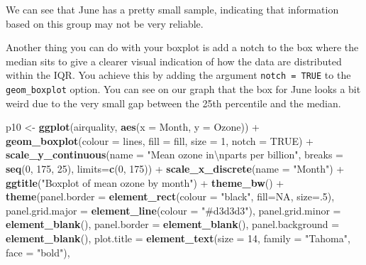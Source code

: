 \documentclass[]{article}
\newenvironment{Shaded}{\begin{snugshade}}{\end{snugshade}}
\newcommand{\KeywordTok}[1]{\textcolor[rgb]{0.13,0.29,0.53}{\textbf{{#1}}}}
\newcommand{\DataTypeTok}[1]{\textcolor[rgb]{0.13,0.29,0.53}{{#1}}}
\newcommand{\DecValTok}[1]{\textcolor[rgb]{0.00,0.00,0.81}{{#1}}}
\newcommand{\CharTok}[1]{\textcolor[rgb]{0.31,0.60,0.02}{{#1}}}
\newcommand{\StringTok}[1]{\textcolor[rgb]{0.31,0.60,0.02}{{#1}}}
\newcommand{\OtherTok}[1]{\textcolor[rgb]{0.56,0.35,0.01}{{#1}}}
\newcommand{\NormalTok}[1]{{#1}}
\begin{document}
We can see that June has a pretty small sample, indicating that
information based on this group may not be very reliable.

Another thing you can do with your boxplot is add a notch to the box
where the median sits to give a clearer visual indication of how the
data are distributed within the IQR. You achieve this by adding the
argument \texttt{notch\ =\ TRUE} to the \texttt{geom\_boxplot} option.
You can see on our graph that the box for June looks a bit weird due to
the very small gap between the 25th percentile and the median.

\begin{Shaded}
\begin{Highlighting}[]
\NormalTok{p10 <-}\StringTok{ }\KeywordTok{ggplot}\NormalTok{(airquality, }\KeywordTok{aes}\NormalTok{(}\DataTypeTok{x =} \NormalTok{Month, }\DataTypeTok{y =} \NormalTok{Ozone)) +}\StringTok{ }
\StringTok{  }\KeywordTok{geom_boxplot}\NormalTok{(}\DataTypeTok{colour =} \NormalTok{lines, }\DataTypeTok{fill =} \NormalTok{fill,}
    \DataTypeTok{size =} \DecValTok{1}\NormalTok{, }\DataTypeTok{notch =} \OtherTok{TRUE}\NormalTok{) +}
\StringTok{  }\KeywordTok{scale_y_continuous}\NormalTok{(}\DataTypeTok{name =} \StringTok{"Mean ozone in}\CharTok{\textbackslash{}n}\StringTok{parts per billion"}\NormalTok{,}
    \DataTypeTok{breaks =} \KeywordTok{seq}\NormalTok{(}\DecValTok{0}\NormalTok{, }\DecValTok{175}\NormalTok{, }\DecValTok{25}\NormalTok{), }\DataTypeTok{limits=}\KeywordTok{c}\NormalTok{(}\DecValTok{0}\NormalTok{, }\DecValTok{175}\NormalTok{)) +}
\StringTok{  }\KeywordTok{scale_x_discrete}\NormalTok{(}\DataTypeTok{name =} \StringTok{"Month"}\NormalTok{) +}
\StringTok{  }\KeywordTok{ggtitle}\NormalTok{(}\StringTok{"Boxplot of mean ozone by month"}\NormalTok{) +}
\StringTok{  }\KeywordTok{theme_bw}\NormalTok{() +}
\StringTok{  }\KeywordTok{theme}\NormalTok{(}\DataTypeTok{panel.border =} \KeywordTok{element_rect}\NormalTok{(}\DataTypeTok{colour =} \StringTok{"black"}\NormalTok{, }\DataTypeTok{fill=}\OtherTok{NA}\NormalTok{, }\DataTypeTok{size=}\NormalTok{.}\DecValTok{5}\NormalTok{),}
    \DataTypeTok{panel.grid.major =} \KeywordTok{element_line}\NormalTok{(}\DataTypeTok{colour =} \StringTok{"#d3d3d3"}\NormalTok{), }
    \DataTypeTok{panel.grid.minor =} \KeywordTok{element_blank}\NormalTok{(), }
    \DataTypeTok{panel.border =} \KeywordTok{element_blank}\NormalTok{(), }\DataTypeTok{panel.background =} \KeywordTok{element_blank}\NormalTok{(),}
    \DataTypeTok{plot.title =} \KeywordTok{element_text}\NormalTok{(}\DataTypeTok{size =} \DecValTok{14}\NormalTok{, }\DataTypeTok{family =} \StringTok{"Tahoma"}\NormalTok{, }\DataTypeTok{face =} \StringTok{"bold"}\NormalTok{),}

\end{Highlighting}
\end{Shaded}
\end{document}
